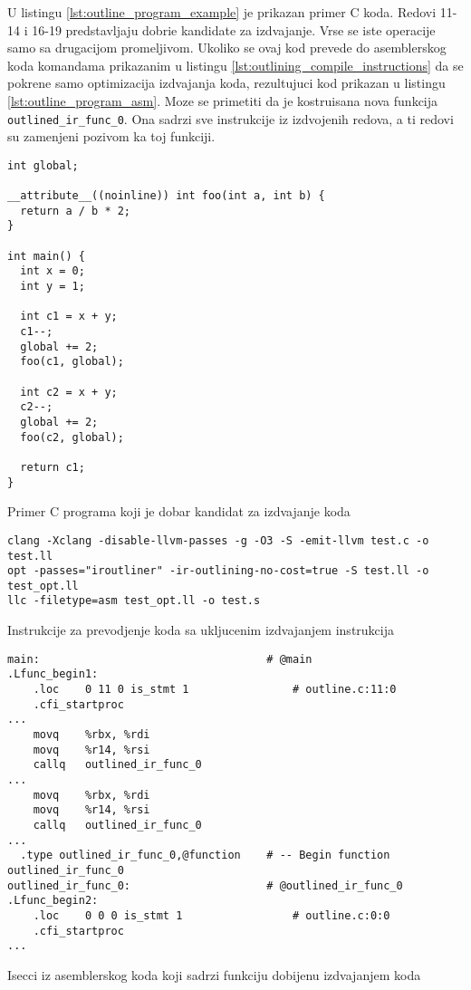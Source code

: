 \documentclass[12pt,oneside]{memoir}
\begin{document}
U listingu \ref{lst:outline_program_example} je prikazan primer C koda.
Redovi 11-14 i 16-19 predstavljaju dobrie kandidate za izdvajanje. Vrse se iste operacije samo sa drugacijom promeljivom.
Ukoliko se ovaj kod prevede do asemblerskog koda komandama prikazanim u listingu \ref{lst:outlining_compile_instructions} da se pokrene samo optimizacija izdvajanja koda, rezultujuci kod prikazan u listingu \ref{lst:outline_program_asm}.
Moze se primetiti da je kostruisana nova funkcija \verb|outlined_ir_func_0|. Ona sadrzi sve instrukcije iz izdvojenih redova, a ti redovi su zamenjeni pozivom ka toj funkciji.

\begin{listing}
\begin{verbatim}
int global;

__attribute__((noinline)) int foo(int a, int b) {
  return a / b * 2;
}

int main() {
  int x = 0;
  int y = 1;
  
  int c1 = x + y;
  c1--;
  global += 2;
  foo(c1, global);
  
  int c2 = x + y;
  c2--;
  global += 2;
  foo(c2, global);
  
  return c1;
}
\end{verbatim}
\caption{Primer C programa koji je dobar kandidat za izdvajanje koda}
\label{lst:outline_program_example}
\end{listing}

\begin{listing}
  \begin{verbatim}
clang -Xclang -disable-llvm-passes -g -O3 -S -emit-llvm test.c -o test.ll
opt -passes="iroutliner" -ir-outlining-no-cost=true -S test.ll -o test_opt.ll
llc -filetype=asm test_opt.ll -o test.s
  \end{verbatim}
  \caption{Instrukcije za prevodjenje koda sa ukljucenim izdvajanjem instrukcija}
  \label{lst:outlining_compile_instructions}
\end{listing}

\begin{listing}
\begin{verbatim}
main:                                   # @main
.Lfunc_begin1:
	.loc	0 11 0 is_stmt 1                # outline.c:11:0
	.cfi_startproc
...
	movq	%rbx, %rdi
	movq	%r14, %rsi
	callq	outlined_ir_func_0
...
	movq	%rbx, %rdi
	movq	%r14, %rsi
	callq	outlined_ir_func_0
...
  .type	outlined_ir_func_0,@function    # -- Begin function outlined_ir_func_0
outlined_ir_func_0:                     # @outlined_ir_func_0
.Lfunc_begin2:
	.loc	0 0 0 is_stmt 1                 # outline.c:0:0
	.cfi_startproc
...
\end{verbatim}
\caption{Isecci iz asemblerskog koda koji sadrzi funkciju dobijenu izdvajanjem koda}
\label{lst:outline_program_asm}
\end{listing}
\end{document}

